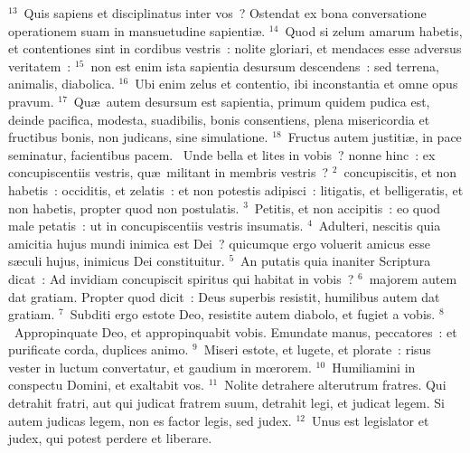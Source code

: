 ${}^{13}$~Quis sapiens et disciplinatus inter vos~? Ostendat ex bona conversatione operationem suam in mansuetudine sapienti\ae .
${}^{14}$~Quod si zelum amarum habetis, et contentiones sint in cordibus vestris~: nolite gloriari, et mendaces esse adversus veritatem~:
${}^{15}$~non est enim ista sapientia desursum descendens~: sed terrena, animalis, diabolica.
${}^{16}$~Ubi enim zelus et contentio, ibi inconstantia et omne opus pravum.
${}^{17}$~Qu\ae\ autem desursum est sapientia, primum quidem pudica est, deinde pacifica, modesta, suadibilis, bonis consentiens, plena misericordia et fructibus bonis, non judicans, sine simulatione.
${}^{18}$~Fructus autem justiti\ae , in pace seminatur, facientibus pacem.
~\lettrine[lines=10,image=true,loversize=0.05,lraise=-0.03]{U}{}nde bella et lites in vobis~? nonne hinc~: ex concupiscentiis vestris, qu\ae\ militant in membris vestris~?
${}^{2}$~concupiscitis, et non habetis~: occiditis, et zelatis~: et non potestis adipisci~: litigatis, et belligeratis, et non habetis, propter quod non postulatis.
${}^{3}$~Petitis, et non accipitis~: eo quod male petatis~: ut in concupiscentiis vestris insumatis.
${}^{4}$~Adulteri, nescitis quia amicitia hujus mundi inimica est Dei~? quicumque ergo voluerit amicus esse s\ae culi hujus, inimicus Dei constituitur.
${}^{5}$~An putatis quia inaniter Scriptura dicat~: Ad invidiam concupiscit spiritus qui habitat in vobis~?
${}^{6}$~majorem autem dat gratiam. Propter quod dicit~: Deus superbis resistit, humilibus autem dat gratiam.
${}^{7}$~Subditi ergo estote Deo, resistite autem diabolo, et fugiet a vobis.
${}^{8}$~Appropinquate Deo, et appropinquabit vobis. Emundate manus, peccatores~: et purificate corda, duplices animo.
${}^{9}$~Miseri estote, et lugete, et plorate~: risus vester in luctum convertatur, et gaudium in mœrorem.
${}^{10}$~Humiliamini in conspectu Domini, et exaltabit vos.
${}^{11}$~Nolite detrahere alterutrum fratres. Qui detrahit fratri, aut qui judicat fratrem suum, detrahit legi, et judicat legem. Si autem judicas legem, non es factor legis, sed judex.
${}^{12}$~Unus est legislator et judex, qui potest perdere et liberare.



